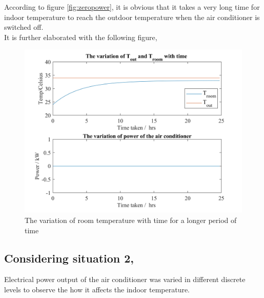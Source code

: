 \documentclass[12pt,a4paper]{article}
\begin{document}
\begin{itemize}
According to figure \ref{fig:zeropower}, it is obvious that it takes a very long time for indoor temperature to reach the outdoor temperature when the air conditioner is switched off.\\

It is further elaborated with the following figure,

\pagebreak
\begin{figure}[htb]
    \centering
    \includegraphics[width=13cm]{images/power_at_zero_long_iterations.jpg}
    \caption{The variation of room temperature with time for a longer period of time}
    \label{fig:zeropower_with_log_iterations}
\end{figure}
\end{itemize}


\subsection*{Considering situation 2,}

Electrical power output of the air conditioner was varied in different discrete levels to observe the how it affects the indoor temperature.
\end{document}
